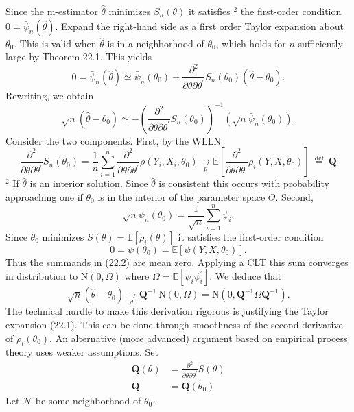 \documentclass[10pt]{article}
\begin{document}
Since the m-estimator $\widehat{\theta}$ minimizes $S_{n}(\theta)$ it satisfies ${ }^{2}$ the first-order condition $0=\bar{\psi}_{n}(\widehat{\theta})$. Expand the right-hand side as a first order Taylor expansion about $\theta_{0}$. This is valid when $\widehat{\theta}$ is in a neighborhood of $\theta_{0}$, which holds for $n$ sufficiently large by Theorem 22.1. This yields
$$
0=\bar{\psi}_{n}(\widehat{\theta}) \simeq \bar{\psi}_{n}\left(\theta_{0}\right)+\frac{\partial^{2}}{\partial \theta \partial \theta^{\prime}} S_{n}\left(\theta_{0}\right)\left(\widehat{\theta}-\theta_{0}\right) .
$$
Rewriting, we obtain
$$
\sqrt{n}\left(\widehat{\theta}-\theta_{0}\right) \simeq-\left(\frac{\partial^{2}}{\partial \theta \partial \theta^{\prime}} S_{n}\left(\theta_{0}\right)\right)^{-1}\left(\sqrt{n} \bar{\psi}_{n}\left(\theta_{0}\right)\right) .
$$
Consider the two components. First, by the WLLN
$$
\frac{\partial^{2}}{\partial \theta \partial \theta^{\prime}} S_{n}\left(\theta_{0}\right)=\frac{1}{n} \sum_{i=1}^{n} \frac{\partial^{2}}{\partial \theta \partial \theta^{\prime}} \rho\left(Y_{i}, X_{i}, \theta_{0}\right) \underset{p}{\longrightarrow} \mathbb{E}\left[\frac{\partial^{2}}{\partial \theta \partial \theta^{\prime}} \rho_{i}\left(Y, X, \theta_{0}\right)\right] \stackrel{\text { def }}{=} \boldsymbol{Q}
$$
${ }^{2}$ If $\widehat{\theta}$ is an interior solution. Since $\widehat{\theta}$ is consistent this occurs with probability approaching one if $\theta_{0}$ is in the interior of the parameter space $\Theta$. Second,
$$
\sqrt{n} \bar{\psi}_{n}\left(\theta_{0}\right)=\frac{1}{\sqrt{n}} \sum_{i=1}^{n} \psi_{i} .
$$
Since $\theta_{0}$ minimizes $S(\theta)=\mathbb{E}\left[\rho_{i}(\theta)\right]$ it satisfies the first-order condition
$$
0=\psi\left(\theta_{0}\right)=\mathbb{E}\left[\psi\left(Y, X, \theta_{0}\right)\right] .
$$
Thus the summands in (22.2) are mean zero. Applying a CLT this sum converges in distribution to $\mathrm{N}(0, \Omega)$ where $\Omega=\mathbb{E}\left[\psi_{i} \psi_{i}^{\prime}\right]$. We deduce that
$$
\sqrt{n}\left(\widehat{\theta}-\theta_{0}\right) \underset{d}{\longrightarrow} \boldsymbol{Q}^{-1} \mathrm{~N}(0, \Omega)=\mathrm{N}\left(0, \boldsymbol{Q}^{-1} \Omega \boldsymbol{Q}^{-1}\right) .
$$
The technical hurdle to make this derivation rigorous is justifying the Taylor expansion (22.1). This can be done through smoothness of the second derivative of $\rho_{i}\left(\theta_{0}\right)$. An alternative (more advanced) argument based on empirical process theory uses weaker assumptions. Set
$$
\begin{aligned}
\boldsymbol{Q}(\theta) &=\frac{\partial^{2}}{\partial \theta \partial \theta^{\prime}} S(\theta) \\
\boldsymbol{Q} &=\boldsymbol{Q}\left(\theta_{0}\right)
\end{aligned}
$$
Let $\mathscr{N}$ be some neighborhood of $\theta_{0}$.
\end{document}

